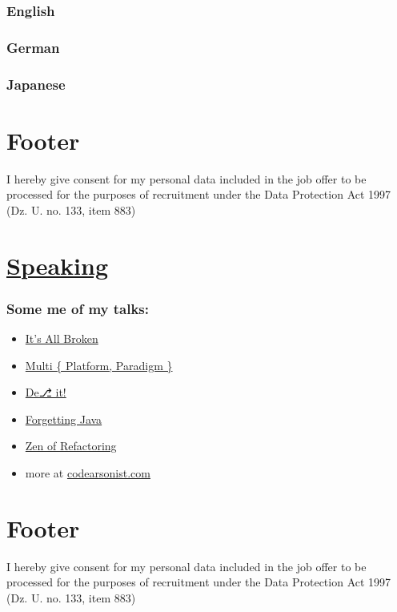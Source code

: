 \documentclass[11pt]{article}
\begin{document}
\subsubsection*{English}
\label{sec:orgfe30284}
\subsubsection*{German}
\label{sec:orge0f74e7}
\subsubsection*{Japanese}
\label{sec:orgab60c79}

\section*{Footer}
\label{sec:org57994da}
I hereby give consent for my personal data included in the job offer to be processed for the purposes of recruitment under the Data Protection Act 1997 (Dz. U. no. 133, item 883)
\section*{\href{https://codearsonist.com}{Speaking}}
\label{sec:org9a5e42e}
\subsubsection*{Some me of my talks:}
\label{sec:orgc82d76e}
\begin{itemize}
\item \href{https://codearsonist.com/talks/its-all-broken}{It's All Broken}
\item \href{https://codearsonist.com/talks/multi-platform-paradigm-programming}{Multi \{ Platform, Paradigm \}}
\item \href{https://codearsonist.com/talks/multi-platform-paradigm-programming}{De⎇ it!}
\item \href{https://codearsonist.com/talks/forgetting-java-why-java-should-die-in-flames-and-take-it-s-developers-along}{Forgetting Java}
\item \href{https://codearsonist.com/talks/forgetting-java-why-java-should-die-in-flames-and-take-it-s-developers-along}{Zen of Refactoring}
\item more at \href{https://codearsonist.com}{codearsonist.com}
\end{itemize}

\section*{Footer}
\label{sec:org0db8a3c}
I hereby give consent for my personal data included in the job offer to be processed for the purposes of recruitment under the Data Protection Act 1997 (Dz. U. no. 133, item 883)
\end{document}
